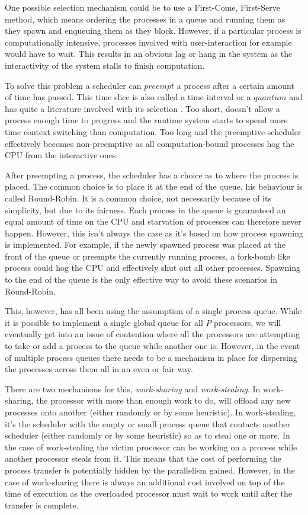 One possible selection mechanism could be to use a First-Come, First-Serve method, 
which means ordering 
the processes in a queue and running them as they spawn and enqueuing them as they 
block. However, if a particular
process is computationally intensive, processes involved with user-interaction 
for example would have to wait. This results in an obvious lag or hang in the 
system as the interactivity of the system stalls to finish computation.

To solve this problem a scheduler can $preempt$ a process after a certain amount
of time has passed. This time slice is also called a time interval or a $quantum$
and has quite a literature involved with its selection
\cite{alam2008finding, mostafa2010finding, saeidi2012determining}.
Too short, doesn't allow a process enough time to progress and the runtime system
starts to spend more time context switching than computation. Too long and the
preemptive-scheduler effectively becomes non-preemptive as all computation-bound
processes hog the CPU from the interactive ones.

After preempting a process, the scheduler has a choice as to where the process
is placed. The common choice is to place it at the end of the queue, his 
behaviour is called Round-Robin. It is a common choice, not necessarily because
of its simplicity, but due to its fairness. Each process in the queue is 
guaranteed an equal amount of time on the CPU and starvation of processes can 
therefore never happen. However, this isn't always the case as it's based on how
process spawning is implemented. For example, if the newly spawned process
was placed at the front of the queue or preempts the currently running process,
a fork-bomb like process could hog the CPU and effectively shut out all other 
processes. Spawning to the end of the queue is the only effective way to avoid
these scenarios in Round-Robin.

This, however, has all been using the assumption of a single process queue. While
it is possible to implement a single global queue for all $P$ processors, we will
eventually get into an issue of contention where all the processors are 
attempting to take or add a process to the queue while another one is. However,
in the event of multiple process queues there needs to be a mechanism in place 
for dispersing the processes across them all in an even or fair way.

There are two mechanisms for this, \emph{work-sharing} and 
\emph{work-stealing}. In work-sharing, the processor with more than enough work
to do, will offload any new processes onto another (either randomly or by some
heuristic). In work-stealing, it's the scheduler with the empty or small process 
queue that contacts another scheduler (either 
randomly or by some heuristic) so as to steal one or more. In the case of 
work-stealing the victim processor can be working on a process while another
processor steals from it. This means that the cost of performing the process
transfer is potentially hidden by the parallelism gained. However, in the case 
of work-sharing there is always an additional cost involved on top of the time
of execution as the overloaded processor must wait to work until after the 
transfer is complete.

